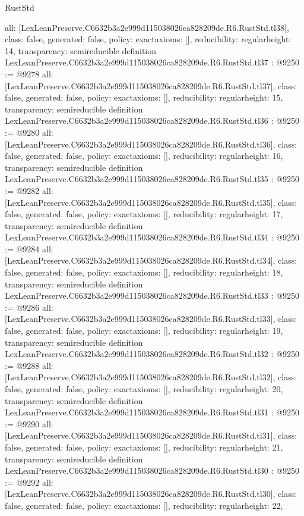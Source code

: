 \begin{lexlean}{RustStd}
\begin{coremodule}
{  all: [LexLeanPreserve.C6632b3a2e999d115038026ca828209de.R6.RustStd.tl38],
  class: false,
  generated: false,
  policy: exact{axioms: []},
  reducibility: regular{height: 14},
  transparency: semireducible
}
definition LexLeanPreserve.C6632b3a2e999d115038026ca828209de.R6.RustStd.tl37 : @9250 := @9278 {
  all: [LexLeanPreserve.C6632b3a2e999d115038026ca828209de.R6.RustStd.tl37],
  class: false,
  generated: false,
  policy: exact{axioms: []},
  reducibility: regular{height: 15},
  transparency: semireducible
}
definition LexLeanPreserve.C6632b3a2e999d115038026ca828209de.R6.RustStd.tl36 : @9250 := @9280 {
  all: [LexLeanPreserve.C6632b3a2e999d115038026ca828209de.R6.RustStd.tl36],
  class: false,
  generated: false,
  policy: exact{axioms: []},
  reducibility: regular{height: 16},
  transparency: semireducible
}
definition LexLeanPreserve.C6632b3a2e999d115038026ca828209de.R6.RustStd.tl35 : @9250 := @9282 {
  all: [LexLeanPreserve.C6632b3a2e999d115038026ca828209de.R6.RustStd.tl35],
  class: false,
  generated: false,
  policy: exact{axioms: []},
  reducibility: regular{height: 17},
  transparency: semireducible
}
definition LexLeanPreserve.C6632b3a2e999d115038026ca828209de.R6.RustStd.tl34 : @9250 := @9284 {
  all: [LexLeanPreserve.C6632b3a2e999d115038026ca828209de.R6.RustStd.tl34],
  class: false,
  generated: false,
  policy: exact{axioms: []},
  reducibility: regular{height: 18},
  transparency: semireducible
}
definition LexLeanPreserve.C6632b3a2e999d115038026ca828209de.R6.RustStd.tl33 : @9250 := @9286 {
  all: [LexLeanPreserve.C6632b3a2e999d115038026ca828209de.R6.RustStd.tl33],
  class: false,
  generated: false,
  policy: exact{axioms: []},
  reducibility: regular{height: 19},
  transparency: semireducible
}
definition LexLeanPreserve.C6632b3a2e999d115038026ca828209de.R6.RustStd.tl32 : @9250 := @9288 {
  all: [LexLeanPreserve.C6632b3a2e999d115038026ca828209de.R6.RustStd.tl32],
  class: false,
  generated: false,
  policy: exact{axioms: []},
  reducibility: regular{height: 20},
  transparency: semireducible
}
definition LexLeanPreserve.C6632b3a2e999d115038026ca828209de.R6.RustStd.tl31 : @9250 := @9290 {
  all: [LexLeanPreserve.C6632b3a2e999d115038026ca828209de.R6.RustStd.tl31],
  class: false,
  generated: false,
  policy: exact{axioms: []},
  reducibility: regular{height: 21},
  transparency: semireducible
}
definition LexLeanPreserve.C6632b3a2e999d115038026ca828209de.R6.RustStd.tl30 : @9250 := @9292 {
  all: [LexLeanPreserve.C6632b3a2e999d115038026ca828209de.R6.RustStd.tl30],
  class: false,
  generated: false,
  policy: exact{axioms: []},
  reducibility: regular{height: 22},
}
\end{coremodule}
\end{lexlean}
